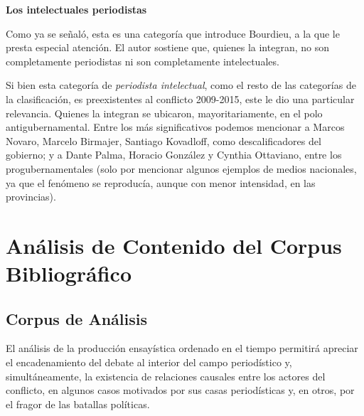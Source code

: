 \textbf{Los intelectuales periodistas}

Como ya se señaló, esta es una categoría que introduce Bourdieu, a la que le presta especial atención. El autor sostiene que, quienes la integran, no son completamente periodistas ni son completamente intelectuales.

Si bien esta categoría de \emph{periodista intelectual}, como el resto de las categorías de la clasificación, es preexistentes al conflicto 2009-2015, este le dio una particular relevancia. Quienes la integran se ubicaron, mayoritariamente, en el polo antigubernamental. Entre los más significativos podemos mencionar a Marcos Novaro, Marcelo Birmajer, Santiago Kovadloff, como descalificadores del gobierno; y a Dante Palma, Horacio González y Cynthia Ottaviano, entre los progubernamentales (solo por mencionar algunos ejemplos de medios nacionales, ya que el fenómeno se reproducía, aunque con menor intensidad, en las provincias).

\chapter {Análisis de Contenido del Corpus Bibliográfico}

\section {Corpus de Análisis}

El análisis de la producción ensayística ordenado en el tiempo permitirá apreciar el encadenamiento del debate al interior del campo periodístico y, simultáneamente, la existencia de relaciones causales entre los actores del conflicto, en algunos casos motivados por sus casas periodísticas y, en otros, por el fragor de las batallas políticas.

